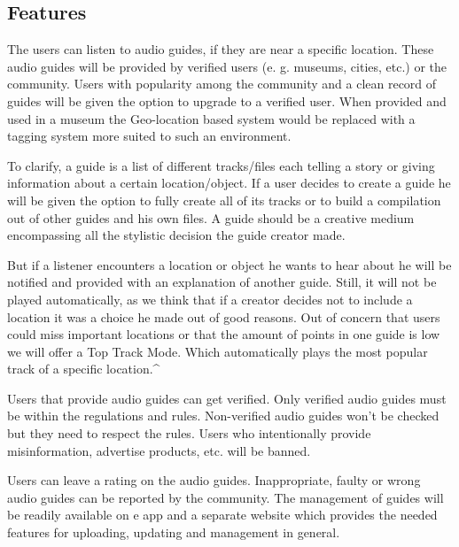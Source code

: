 \documentclass[12pt]{article}
\theoremstyle{definition}
\newenvironment{text}{
}{}
\begin{document}
\subsection{Features}
\begin{text}
The users can listen to audio guides, if they are near a specific location. These audio guides will be provided by verified users (e. g. museums, cities, etc.) or the community. Users with popularity among the community and a clean record of guides will be given the option to upgrade to a verified user.
When provided and used in a museum the Geo-location based system would be replaced with a tagging system more suited to such an environment.\newline
 
To clarify, a guide is a list of different tracks/files each telling a story or giving information about a certain location/object. If a user decides to create a guide he will be given the option to fully create all of its tracks or to build a compilation out of other guides and his own files. A guide should be a creative medium encompassing all the stylistic decision the guide creator made. \newline

But if a listener encounters a location or object he wants to hear about he will be notified and provided with an explanation of another guide. Still, it will not be played automatically, as we think that if a creator decides not to include a location it was a choice he made out of good reasons.
Out of concern that users could miss important locations or that the amount of points in one guide is low we will offer a Top Track Mode. Which automatically plays the most popular track of a specific location.\newline^
 
Users that provide audio guides can get verified. Only verified audio guides must be within the regulations and rules. Non-verified audio guides won’t be checked but they need to respect the rules. Users who intentionally provide misinformation, advertise products, etc. will be banned.\newline
 
Users can leave a rating on the audio guides. Inappropriate, faulty or wrong audio guides can be reported by the community. The management of guides will be readily available on e app and a separate website which provides the needed features for uploading, updating and management in general.\newline


\end{text}
\end{document}
